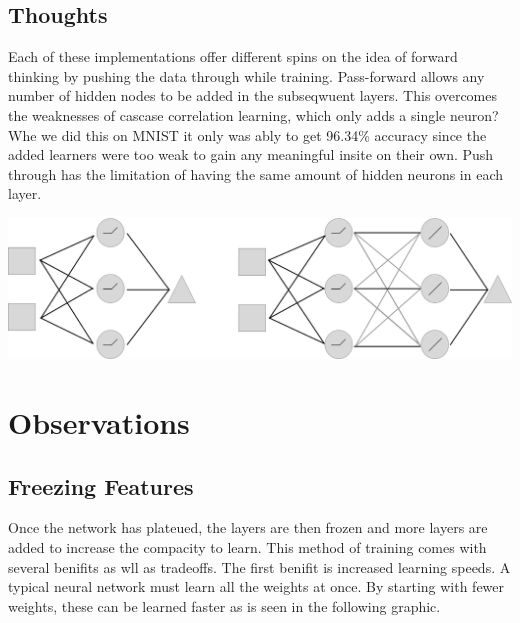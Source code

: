 \documentclass{article}
\begin{document}
\subsection{Thoughts}

Each of these implementations offer different spins on the idea of forward thinking by pushing the data through while training. Pass-forward allows any number of hidden nodes to be added in the subseqwuent layers. This overcomes the weaknesses of cascase correlation learning, which only adds a single neuron? Whe we did this on MNIST it only was ably to get 96.34\% accuracy since the added learners were too weak to gain any meaningful insite on their own. Push through has the limitation of having the same amount of hidden neurons in each layer. 

\begin{center}
\includegraphics[scale=.22]{push-forward}
\end{center}


\section{Observations}

\subsection{Freezing Features}

Once the network has plateued, the layers are then frozen and more layers are added to increase the compacity to  learn. This method of training comes with several benifits as wll as tradeoffs. The first benifit is increased learning speeds. A typical neural network must learn all the weights at once. By starting with fewer weights, these can be learned faster as is seen in the following graphic.
\end{document}

